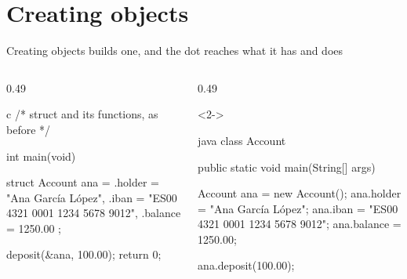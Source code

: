\documentclass[\deckoptions]{beamer}
\begin{document}
\section{Creating objects}

\begin{frame}[fragile]{Creating objects}{ builds one, and the dot reaches what it has and does}
  \begin{columns}[T, onlytextwidth]
    \begin{column}{0.49\textwidth}
\begin{codeblock}[steps={|4|5-7|10|}, steps from=2, diff, dense, marks={4/3, 5-7/4/state, 10/5/behavior}]{c}
/* struct and its functions, as before */

int main(void) {
    struct Account ana = {
        .holder = "Ana García López",
        .iban = "ES00 4321 0001 1234 5678 9012",
        .balance = 1250.00
    };

    deposit(&ana, 100.00);
    return 0;
}
\end{codeblock}
    \end{column}
    \begin{column}{0.49\textwidth}
      \begin{uncoverenv}<2->
\begin{codeblock}[steps={|3|4-6|8|}, steps from=2, diff, dense, marks={3/3, 4-6/4/state, 8/5/behavior}]{java}
class Account {
    public static void main(String[] args) {
        Account ana = new Account();
        ana.holder = "Ana García López";
        ana.iban = "ES00 4321 0001 1234 5678 9012";
        ana.balance = 1250.00;

        ana.deposit(100.00);
    }

}
\end{codeblock}
\end{uncoverenv}
\end{column}
\end{columns}
\end{frame}
\end{document}
